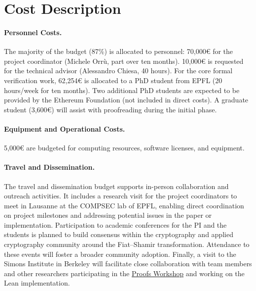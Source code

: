 \documentclass{article}
\begin{document}
\section{Cost Description}


\paragraph{Personnel Costs.} The majority of the budget (87\%) is allocated to personnel: 70,000\euro{} for the project coordinator (Michele Orrù, part over ten months). 10,000\euro{} is requested for the technical advisor (Alessandro Chiesa, 40 hours). For the core formal verification work, 62,254\euro{} is allocated to a PhD student from EPFL (20 hours/week for ten months). Two additional PhD students are expected to be provided by the Ethereum Foundation (not included in direct costs). A graduate student (3,600\euro{}) will assist with proofreading during the initial phase.

\paragraph{Equipment and Operational Costs.}
5,000\euro{} are budgeted for computing resources, software licenses, and equipment.

\paragraph{Travel and Dissemination.} The travel and dissemination budget supports in-person collaboration and outreach activities. It includes a research visit for the project coordinators to meet in Lausanne at the COMPSEC lab of EPFL, enabling direct coordination on project milestones and addressing potential issues in the paper or implementation. Participation to academic conferences for the PI and the students is planned to build consensus within the cryptography and applied cryptography community around the Fiat--Shamir transformation. Attendance to these events will foster a broader community adoption. Finally, a visit to the Simons Institute in Berkeley will facilitate close collaboration with team members and other researchers participating in the \href{https://simons.berkeley.edu/workshops/cryptography-10-years-later-obfuscation-proof-systems-secure-computation-boot-campx}{Proofs Workshop} and working on the Lean implementation.
\end{document}
